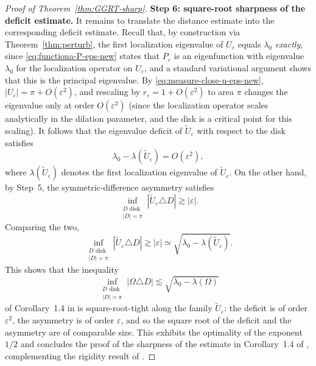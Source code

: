 \documentclass[a4paper,11pt,reqno]{amsart}
\numberwithin{equation}{section}
\theoremstyle{plain} %
\theoremstyle{definition} %
\theoremstyle{remark}
\begin{document}
\begin{proof}[Proof of Theorem~\ref{thm:GGRT-sharp}]
\medskip
\noindent
{\bf Step 6: square-root sharpness of the deficit estimate.} It remains to translate the distance estimate into the corresponding deficit
estimate. Recall that, by construction via Theorem~\ref{thm:perturb}, the
first localization eigenvalue of \(U_\varepsilon\) equals \(\lambda_0\)
\emph{exactly}, since \eqref{eq:functiona-P-eps-new} states that
\(P_\varepsilon\) is an eigenfunction with eigenvalue \(\lambda_0\) for the
localization operator on \(U_\varepsilon\), and a standard variational
argument shows that this is the principal eigenvalue. By
\eqref{eq:measure-close-u-eps-new},
\(|U_\varepsilon|=\pi+O(\varepsilon^2)\), and rescaling by
\(r_\varepsilon=1+O(\varepsilon^2)\) to area \(\pi\) changes the eigenvalue
only at order \(O(\varepsilon^2)\) (since the localization operator scales
analytically in the dilation parameter, and the disk is a critical point for
this scaling). It follows that the eigenvalue deficit of
\(\widetilde U_\varepsilon\) with respect to the disk satisfies
\[
\lambda_0-\lambda(\widetilde U_\varepsilon)=O(\varepsilon^2),
\]
where \(\lambda(\widetilde U_\varepsilon)\) denotes the first localization
eigenvalue of \(\widetilde U_\varepsilon\). On the other hand, by Step~5,
the symmetric-difference asymmetry satisfies
\[
\inf_{\substack{D\text{ disk}\\ |D|=\pi}}|\widetilde U_\varepsilon\triangle D|
\gtrsim |\varepsilon|.
\]
Comparing the two,
\[
\inf_{\substack{D\text{ disk}\\ |D|=\pi}}|\widetilde U_\varepsilon\triangle D|
\gtrsim |\varepsilon|
\simeq
\sqrt{\lambda_0-\lambda(\widetilde U_\varepsilon)}.
\]
This shows that the inequality
\[
\inf_{\substack{D\text{ disk}\\ |D|=\pi}}
|\Omega\triangle D|
\lesssim
\sqrt{\lambda_0-\lambda(\Omega)}
\]
of Corollary~1.4 in \cite{Gomez-Guerra-Ramos-Tilli} is square-root-tight along
the family \(\widetilde U_\varepsilon\): the deficit is of order
\(\varepsilon^2\), the asymmetry is of order \(\varepsilon\), and so the
square root of the deficit and the asymmetry are of comparable size. This
exhibits the optimality of the exponent \(1/2\) and concludes the proof of the
sharpness of the estimate in Corollary~1.4 of
\cite{Gomez-Guerra-Ramos-Tilli}, complementing the rigidity result of
\cite{Nicola-Tilli}.

\end{proof}

\end{document}
